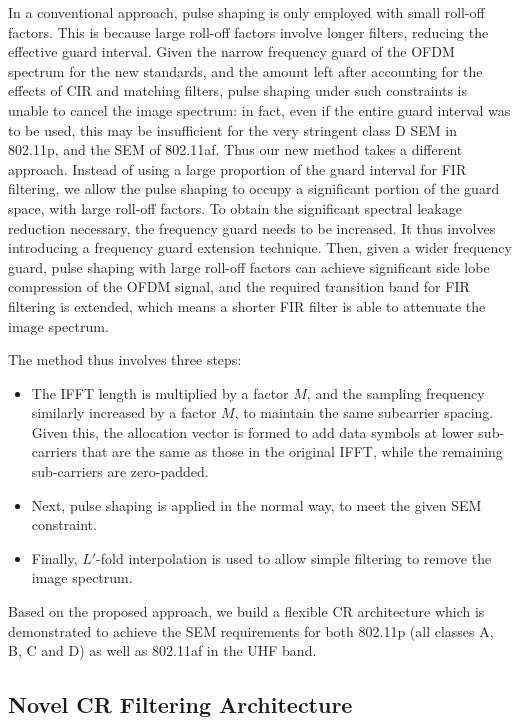 In a conventional approach, pulse shaping is only employed with small roll-off factors.
This is because large roll-off factors involve longer filters, reducing the effective guard interval.
Given the narrow frequency guard of the OFDM spectrum for the new standards, and the amount left after accounting for the effects of CIR and matching filters, pulse shaping under such constraints is unable to cancel the image spectrum: in fact, even if the entire guard interval was to be used, this may be insufficient for the very stringent class D SEM in 802.11p, and the SEM of 802.11af.
Thus our new method takes a different approach.
Instead of using a large proportion of the guard interval for FIR filtering, we allow the pulse shaping to occupy a significant portion of the guard space, with large roll-off factors.
To obtain the significant spectral leakage reduction necessary, the frequency guard needs to be increased.
It thus involves introducing a frequency guard extension technique.
Then, given a wider frequency guard, pulse shaping with large roll-off factors can achieve significant side lobe compression of the OFDM signal, and the required transition band for FIR filtering is extended, which means a shorter FIR filter is able to attenuate the image spectrum.

The method thus involves three steps:

\begin{itemize}
\item The IFFT length is multiplied by a factor $M$, and the sampling frequency similarly increased by a factor $M$, to maintain the same subcarrier spacing.
Given this, the allocation vector is formed to add data symbols at lower sub-carriers that are the same as those in the original IFFT, while the remaining sub-carriers are zero-padded.
\item Next, pulse shaping is applied in the normal way, to meet the given SEM constraint.
\item Finally, $L'$-fold interpolation is used to allow simple filtering to remove the image spectrum.
\end{itemize}

Based on the proposed approach, we build a flexible CR architecture which is demonstrated to achieve the SEM requirements for both 802.11p (all classes A, B, C and D) as well as 802.11af in the UHF band.

\subsection{Novel CR Filtering Architecture}

